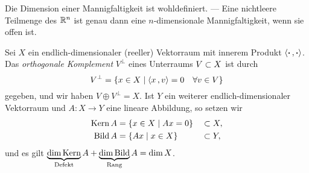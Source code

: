 \documentclass[skript.tex]{subfiles}
\begin{document}
	\begin{bem}
		Die Dimension einer Mannigfaltigkeit ist wohldefiniert. ---
		Eine nichtleere Teilmenge des $\mathbb{R}^n$ ist genau dann eine
		$n$-dimensionale Mannigfaltigkeit, wenn sie offen ist.
	\end{bem}
	
	\begin{notat}
		Sei $X$ ein endlich-dimensionaler (reeller) Vektorraum mit innerem Produkt $\langle \boldsymbol{\cdot}\,{,}\,\boldsymbol{\cdot} \rangle$.
		Das \emph{orthogonale Komplement} $V^{\perp}$ eines Unterraums $V \subset X$
		ist durch
		\[
			V^{\perp} = \{ x\in X \mid \langle x\,{,}\,v \rangle=0 \quad \forall v\in V\}
		\]
		gegeben, und wir haben $V \oplus V^{\perp}=X$.
		Ist $Y$ ein weiterer endlich-dimensionaler Vektorraum
		und $A \colon X \to Y$ eine lineare Abbildung, so setzen wir
		\begin{alignat*}{2}
			\operatorname{Kern} A &= \{x\in X \mid Ax=0\} &&\subset X, \\
			\operatorname{Bild} A &= \{Ax \mid x\in X\} &&\subset Y,
		\end{alignat*}
		und es gilt $\underbrace{\dim\operatorname{Kern}}_{\text{Defekt}} A + \underbrace{\dim\operatorname{Bild}}_{\text{Rang}} A = \dim X$.
	\end{notat}
\end{document}
